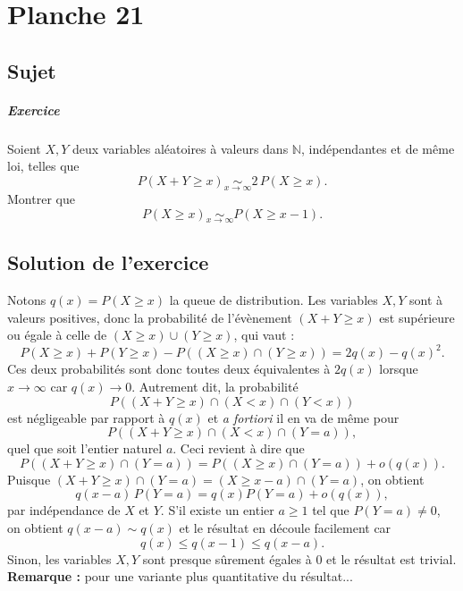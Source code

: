 \chapter{Planche 21}

\section{Sujet}

\paragraph{Exercice}

Soient $X,Y$ deux variables aléatoires à valeurs dans $\mathbb N$, indépendantes et de même loi, telles que
$$
P(X+Y \geqslant x) \underset{x\to\infty}\sim 2\,P(X \geqslant x).
$$
Montrer que
$$
P(X \geqslant x) \underset{x\to\infty}\sim P(X \geqslant x-1).
$$

\section{Solution de l'exercice}

Notons $q(x) = P(X \geqslant x)$ la queue de distribution. Les variables $X,Y$ sont à valeurs positives, donc la probabilité de l'évènement $(X + Y \geqslant x)$ est supérieure ou égale à celle de $(X\geqslant x) \cup (Y \geqslant x)$, qui vaut :
\[
P(X\geqslant x) + P(Y \geqslant x) - P((X\geqslant x) \cap (Y \geqslant x)) = 2q(x) - q(x)^2.
\]
Ces deux probabilités sont donc toutes deux équivalentes à $2q(x)$ lorsque $x \to \infty$ car $q(x) \to 0$. Autrement dit, la probabilité
\[
P((X + Y \geqslant x) \cap (X < x) \cap (Y < x)) 
\]
est négligeable par rapport à $q(x)$ et \textit{a fortiori} il en va de même pour
\[
P((X + Y \geqslant x) \cap (X < x) \cap (Y = a)),
\]
quel que soit l'entier naturel $a$. Ceci revient à dire que
\[
P((X+Y \geqslant x) \cap (Y = a)) = P((X \geqslant x) \cap (Y = a)) + o(q(x)).
\]
Puisque $(X+Y \geqslant x) \cap (Y=a) = (X \geqslant x - a) \cap (Y=a)$, on obtient
\[
q(x-a)\,P(Y = a) = q(x) P(Y = a) + o(q(x)),
\]
par indépendance de $X$ et $Y$. S'il existe un entier $a \geqslant 1$ tel que $P(Y = a) \neq 0$, on obtient $q(x - a) \sim q(x)$ et le résultat en découle facilement car
\[
q(x) \leqslant q(x-1) \leqslant q(x-a).
\]
Sinon, les variables $X,Y$ sont presque sûrement égales à $0$ et le résultat est trivial.\\


\textbf{Remarque : } pour une variante plus quantitative du résultat...\\


